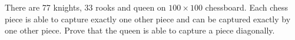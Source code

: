 \problem
There are 77 knights, 33 rooks and queen on $100 \times 100$ chessboard.
Each chess piece is able to capture exactly one other piece and can be captured
exactly by one other piece.
Prove that the queen is able to capture a piece diagonally.
\solution
\endproblem
